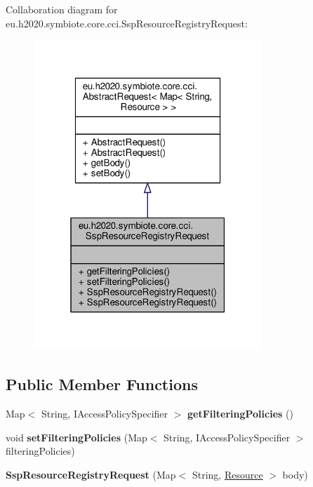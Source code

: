 Collaboration diagram for eu.\+h2020.\+symbiote.\+core.\+cci.\+Ssp\+Resource\+Registry\+Request\+:\nopagebreak
\begin{figure}[H]
\begin{center}
\leavevmode
\includegraphics[width=244pt]{classeu_1_1h2020_1_1symbiote_1_1core_1_1cci_1_1SspResourceRegistryRequest__coll__graph}
\end{center}
\end{figure}
\subsection*{Public Member Functions}
\begin{DoxyCompactItemize}
\item 
\mbox{\label{classeu_1_1h2020_1_1symbiote_1_1core_1_1cci_1_1SspResourceRegistryRequest_abed199c63e44e2d50219683245fc6688}} 
Map$<$ String, I\+Access\+Policy\+Specifier $>$ {\bfseries get\+Filtering\+Policies} ()
\item 
\mbox{\label{classeu_1_1h2020_1_1symbiote_1_1core_1_1cci_1_1SspResourceRegistryRequest_ac7199cae7b405c912934065f9c212018}} 
void {\bfseries set\+Filtering\+Policies} (Map$<$ String, I\+Access\+Policy\+Specifier $>$ filtering\+Policies)
\item 
\mbox{\label{classeu_1_1h2020_1_1symbiote_1_1core_1_1cci_1_1SspResourceRegistryRequest_a426df97c98260e639a36d91bd2b0903e}} 
{\bfseries Ssp\+Resource\+Registry\+Request} (Map$<$ String, \hyperlink{classeu_1_1h2020_1_1symbiote_1_1model_1_1cim_1_1Resource}{Resource} $>$ body)
\end{DoxyCompactItemize}


